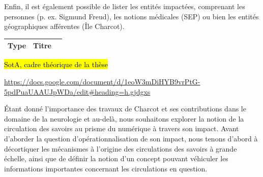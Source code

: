 
Enfin, il est également possible de lister les entités impactées, comprenant les personnes (p. ex. Sigmund Freud), les notions médicales (SEP) ou bien les entités géographiques afférentes (Île Charcot).

\label{sect:sota}
\begin{table}[h]
	\centering
	\begin{tabularx}{\textwidth}{|>{\centering\arraybackslash}p{3.5cm}|>{\centering\arraybackslash}X|>{\centering\arraybackslash}X|}
		\hline
		Type & Titre &  \\
		\hline
	\end{tabularx}
\end{table}

\hl{SotA, cadre théorique de la thèse}

\url{https://docs.google.com/document/d/1eoW3mDiHYB9vrPtG-5pdPuaUAAUJpWDa/edit\#heading=h.gjdgxs}


Étant donné l'importance des travaux de Charcot et ses contributions dans le domaine de la neurologie et au-delà, nous souhaitons explorer la notion de la circulation des savoirs au prisme du numérique à travers son impact. Avant d'aborder la question d'opérationnalisation de son impact, nous tenons d'abord à décortiquer les mécanismes à l'origine des circulations des savoirs à grande échelle, ainsi que de définir la notion d'un \og{}concept\fg{} pouvant véhiculer les informations importantes concernant les circulations en question. 








